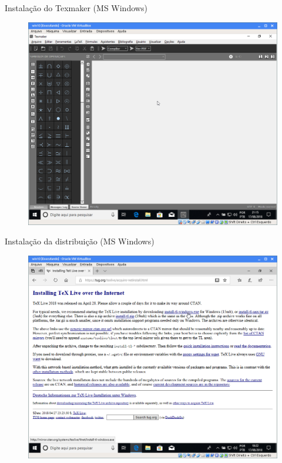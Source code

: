 \documentclass{beamer}
\begin{document}
\begin{frame}{Instala\c{c}\~ao do Texmaker (MS Windows)}
    \begin{figure}[h]
        \includegraphics[scale=0.25]{fig/texmaker-02.png}
    \end{figure}
\end{frame}

\begin{frame}{Instala\c{c}\~ao da distribui\c{c}\~ao (MS Windows)}
    \begin{figure}[h]
        \includegraphics[scale=0.25]{fig/texlive-site.png}
    \end{figure}
\end{frame}
\end{document}
